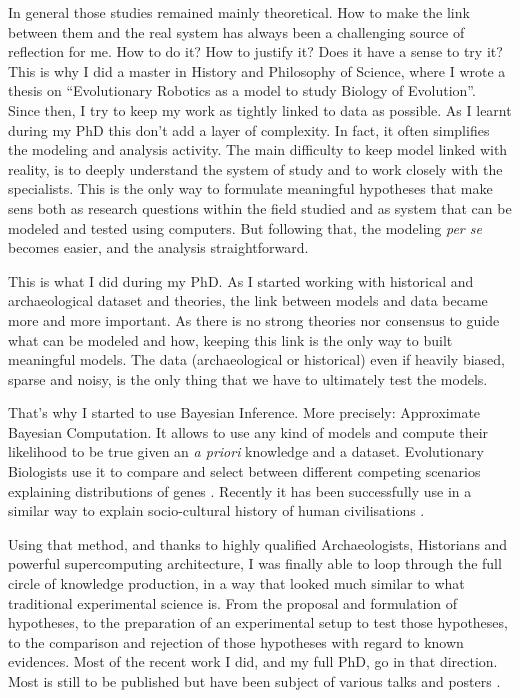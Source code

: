 \documentclass[10pt]{article}
\begin{document}
In general those studies remained mainly theoretical. How to make the link between them and the real system has always been a challenging source of reflection for me.  How to do it? How to justify it? Does it have a sense to try it? This is why I did a  master in History and Philosophy of Science, where I wrote a thesis on ``Evolutionary Robotics as a model to study Biology of Evolution''. Since then, I try to keep my work as tightly linked to data as possible. As I learnt during my PhD this don't add a layer of complexity. In fact, it often simplifies the modeling and analysis activity. The main difficulty to keep model linked with reality, is to deeply understand the system of study and to work closely with the specialists. This is the only way to formulate meaningful hypotheses that make sens both as research questions within the field studied and as system that can be modeled and tested using computers. But following that, the modeling \emph{per se} becomes easier, and the analysis straightforward. 

This is what I did during my PhD. As I started working with historical and archaeological dataset and theories, the link between models and data became more and more important. As there is no strong theories nor consensus to guide what can be modeled and how, keeping this link is the only way to built meaningful models. The data (archaeological or historical) even if heavily biased, sparse and noisy, is the only thing that we have to ultimately test the models.

That's why I started to use Bayesian Inference. More precisely: Approximate Bayesian Computation. It allows to use any kind of models and compute their likelihood to be true given an \emph{a priori} knowledge and a dataset. Evolutionary Biologists use it to compare and select between different competing scenarios explaining distributions of genes \cite{beaumont2009adaptiveapproximatebayesiancomputation}. Recently it has been successfully use in a similar way to explain socio-cultural history of human civilisations \cite{rubiocampillo2016modelselectioninhistoricalresearchusingapproximatebayesiancomputation,kandler2017inferringindividuallevelprocessesfrompopulationlevelpatternsinculturalevolution}.

Using that method, and thanks to highly qualified Archaeologists, Historians and powerful supercomputing architecture,  I was finally able to loop through the full circle of knowledge production, in a way that looked much similar to what traditional experimental science is. From the proposal and formulation of hypotheses, to the preparation of an experimental setup to test those hypotheses, to the comparison and rejection of those hypotheses with regard to known evidences. Most of the recent work I did, and my full PhD, go in that direction. Most is still to be published but have been subject of various talks and posters \cite{coto2016exploringamphorabetica,carrignon2018abmtrac,romanowska2018jerash,carrignon2017impactofdifferentsociallearningmechanismsontheemergenceofawalrasianequilibrium,carrignon2018hpcmodel,carrignon2018}. 
\end{document}
